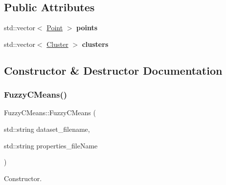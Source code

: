 \subsection*{Public Attributes}
\begin{DoxyCompactItemize}
\item 
\mbox{\label{class_fuzzy_c_means_ab75d3a803819d861585ff2d0fea218fa}} 
std\+::vector$<$ \mbox{\hyperlink{class_point}{Point}} $>$ {\bfseries points}
\item 
\mbox{\label{class_fuzzy_c_means_a3d3b7598064323842312bdc7845540cd}} 
std\+::vector$<$ \mbox{\hyperlink{class_cluster}{Cluster}} $>$ {\bfseries clusters}
\end{DoxyCompactItemize}


\subsection{Constructor \& Destructor Documentation}
\mbox{\label{class_fuzzy_c_means_a061d8ad3ae21e92a3a1e6b7d005ca3cf}} 
\subsubsection{\texorpdfstring{Fuzzy\+C\+Means()}{FuzzyCMeans()}\hspace{0.1cm}{\footnotesize\ttfamily [1/2]}}
{\footnotesize\ttfamily Fuzzy\+C\+Means\+::\+Fuzzy\+C\+Means (\begin{DoxyParamCaption}\item[{std\+::string}]{dataset\+\_\+filename,  }\item[{std\+::string}]{properties\+\_\+file\+Name }\end{DoxyParamCaption})}

Constructor. \mbox{\label{class_fuzzy_c_means_a24014c19f6ab66fdb228bd2fc9588ce1}} 
